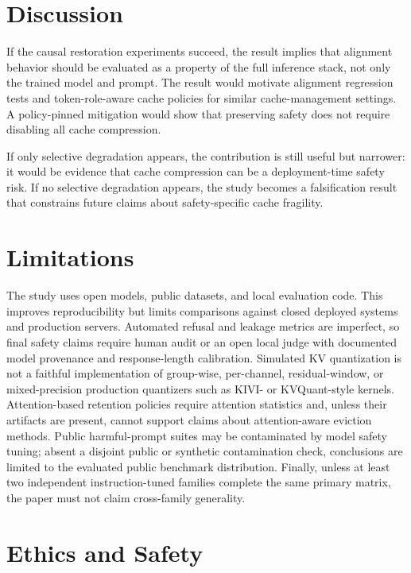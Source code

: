 \documentclass[11pt]{article}
\begin{document}
\section{Discussion}

If the causal restoration experiments succeed, the result implies that alignment behavior should be evaluated as a property of the full inference stack, not only the trained model and prompt. The result would motivate alignment regression tests and token-role-aware cache policies for similar cache-management settings. A policy-pinned mitigation would show that preserving safety does not require disabling all cache compression.

If only selective degradation appears, the contribution is still useful but narrower: it would be evidence that cache compression can be a deployment-time safety risk. If no selective degradation appears, the study becomes a falsification result that constrains future claims about safety-specific cache fragility.

\section{Limitations}

The study uses open models, public datasets, and local evaluation code. This improves reproducibility but limits comparisons against closed deployed systems and production servers. Automated refusal and leakage metrics are imperfect, so final safety claims require human audit or an open local judge with documented model provenance and response-length calibration. Simulated KV quantization is not a faithful implementation of group-wise, per-channel, residual-window, or mixed-precision production quantizers such as KIVI- or KVQuant-style kernels. Attention-based retention policies require attention statistics and, unless their artifacts are present, cannot support claims about attention-aware eviction methods. Public harmful-prompt suites may be contaminated by model safety tuning; absent a disjoint public or synthetic contamination check, conclusions are limited to the evaluated public benchmark distribution. Finally, unless at least two independent instruction-tuned families complete the same primary matrix, the paper must not claim cross-family generality.

\section{Ethics and Safety}
\end{document}
